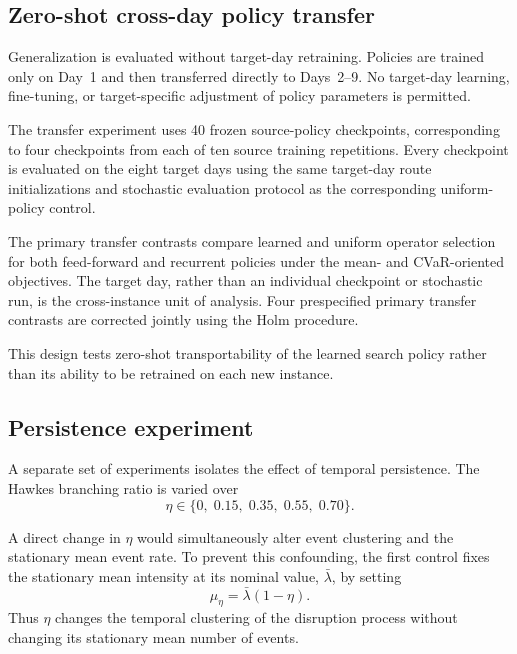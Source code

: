 \documentclass[preprint,12pt]{elsarticle}
\newcommand{\1}{\mathbf{1}}
\begin{document}
\subsection{Zero-shot cross-day policy transfer}
\label{subsec:transfer}

Generalization is evaluated without target-day retraining.
Policies are trained only on Day~1 and then transferred directly to Days~2--9.
No target-day learning, fine-tuning, or target-specific adjustment of policy
parameters is permitted.

The transfer experiment uses 40 frozen source-policy checkpoints, corresponding
to four checkpoints from each of ten source training repetitions. Every
checkpoint is evaluated on the eight target days using the same target-day route
initializations and stochastic evaluation protocol as the corresponding
uniform-policy control.

The primary transfer contrasts compare learned and uniform operator selection
for both feed-forward and recurrent policies under the mean- and CVaR-oriented
objectives. The target day, rather than an individual checkpoint or stochastic
run, is the cross-instance unit of analysis. Four prespecified primary transfer
contrasts are corrected jointly using the Holm procedure.

This design tests zero-shot transportability of the learned search policy rather
than its ability to be retrained on each new instance.

\subsection{Persistence experiment}
\label{subsec:persistence_experiment}

A separate set of experiments isolates the effect of temporal persistence.
The Hawkes branching ratio is varied over
\begin{equation}
	\eta
	\in
	\{0,\;0.15,\;0.35,\;0.55,\;0.70\}.
	\label{eq:eta_grid}
\end{equation}

A direct change in $\eta$ would simultaneously alter event clustering and the
stationary mean event rate. To prevent this confounding, the first control fixes
the stationary mean intensity at its nominal value,
$\bar{\lambda}$, by setting
\begin{equation}
	\mu_{\eta}
	=
	\bar{\lambda}(1-\eta).
	\label{eq:mu_matched}
\end{equation}
Thus $\eta$ changes the temporal clustering of the disruption process without
changing its stationary mean number of events.
\end{document}
